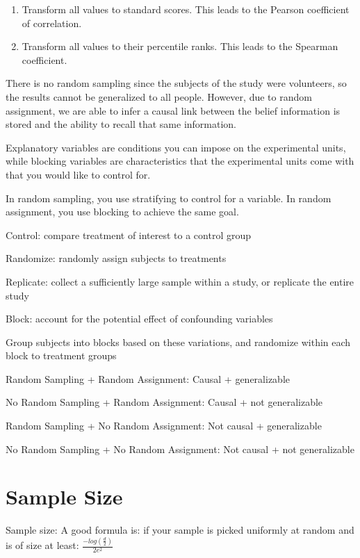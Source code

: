 \documentclass[]{book}
\begin{document}
\begin{enumerate}
\def\labelenumi{\arabic{enumi}.}
\item
  Transform all values to standard scores. This leads to the Pearson
  coefficient of correlation.
\item
  Transform all values to their percentile ranks. This leads to the
  Spearman coefficient.
\end{enumerate}

There is no random sampling since the subjects of the study were
volunteers, so the results cannot be generalized to all people. However,
due to random assignment, we are able to infer a causal link between the
belief information is stored and the ability to recall that same
information.

Explanatory variables are conditions you can impose on the experimental
units, while blocking variables are characteristics that the
experimental units come with that you would like to control for.

In random sampling, you use stratifying to control for a variable. In
random assignment, you use blocking to achieve the same goal.

Control: compare treatment of interest to a control group

Randomize: randomly assign subjects to treatments

Replicate: collect a sufficiently large sample within a study, or
replicate the entire study

Block: account for the potential effect of confounding variables

Group subjects into blocks based on these variations, and randomize
within each block to treatment groups

Random Sampling + Random Assignment: Causal + generalizable

No Random Sampling + Random Assignment: Causal + not generalizable

Random Sampling + No Random Assignment: Not causal + generalizable

No Random Sampling + No Random Assignment: Not causal + not
generalizable

\section{Sample Size}\label{sample-size}

Sample size: A good formula is: if your sample is picked uniformly at
random and is of size at least: \(\frac{-log(\frac{d}{2})}{2e^2}\)
\end{document}
